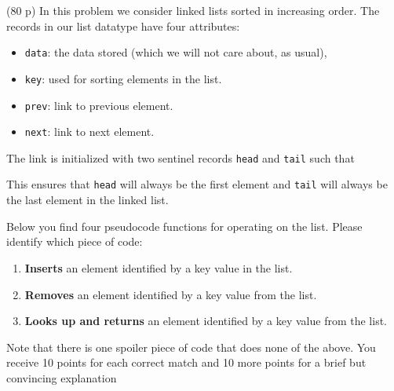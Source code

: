 \documentclass{jn-pset}
\begin{document}
\begin{problem}
  (80 p)
  In this problem we consider linked lists sorted in increasing order.
  The records in our list datatype have four attributes:
  \begin{itemize}
  \item
    \verb+data+: the data stored (which we will not care about, as usual),
    
  \item
    \verb+key+: used for sorting elements in the list.
    
  \item
    \verb+prev+: link to previous element.
    
  \item
    \verb+next+: link to next element.
    
  \end{itemize}
  The link is initialized with two sentinel records
  \verb+head+
  and
  \verb+tail+
  such that
  This ensures that \verb+head+ will always be the first element and
  \verb+tail+ will always be the last element in the linked list.

  Below you find four pseudocode functions for operating on the list.
  Please identify which piece of code:
  \begin{enumerate}
  \item
    \textbf{Inserts} an element
    identified by a key value
    in the list.
    
  \item
    \textbf{Removes} an element
    identified by a key value
    from the list.

  \item
    \textbf{Looks up and returns}
    an element
    identified by a key value
    from the list.

  \end{enumerate}
  Note that there is one spoiler piece of code that does none of the above.
  You receive 10 points for each correct match and 10 more points for a brief but convincing
  explanation


\end{problem}
\end{document}

